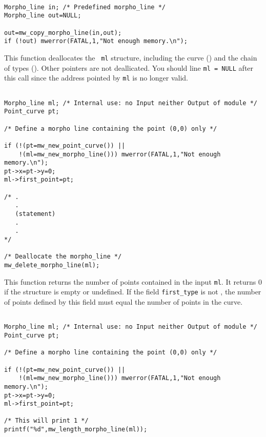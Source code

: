 \Next
\Example
\begin{verbatim}

Morpho_line in; /* Predefined morpho_line */
Morpho_line out=NULL; 

out=mw_copy_morpho_line(in,out);
if (!out) mwerror(FATAL,1,"Not enough memory.\n");
\end{verbatim}

\newpage %


\Description
This function deallocates the \mline\ \verb+ml+ structure, including the
curve (\point) and the chain of types (\pt). Other pointers are
not deallicated.
You should line \verb+ml = NULL+ after this call since the address pointed
by \verb+ml+ is no longer valid.

\Next
\Example
\begin{verbatim}

Morpho_line ml; /* Internal use: no Input neither Output of module */
Point_curve pt;

/* Define a morpho line containing the point (0,0) only */

if (!(pt=mw_new_point_curve()) ||
    !(ml=mw_new_morpho_line())) mwerror(FATAL,1,"Not enough memory.\n");
pt->x=pt->y=0;
ml->first_point=pt;

/* .
   .
   (statement)
   .
   .
*/

/* Deallocate the morpho_line */
mw_delete_morpho_line(ml);

\end{verbatim}

\newpage %


\Description
This function returns the number of points contained in the input
\verb+ml+.
It returns $0$ if the structure is empty or undefined.
If the field \verb+first_type+ is not \Null, the number of points
defined by this field must equal the number of points in the curve.

\Next
\Example
\begin{verbatim}

Morpho_line ml; /* Internal use: no Input neither Output of module */
Point_curve pt;

/* Define a morpho line containing the point (0,0) only */

if (!(pt=mw_new_point_curve()) ||
    !(ml=mw_new_morpho_line())) mwerror(FATAL,1,"Not enough memory.\n");
pt->x=pt->y=0;
ml->first_point=pt;

/* This will print 1 */
printf("%d",mw_length_morpho_line(ml));
\end{verbatim}

